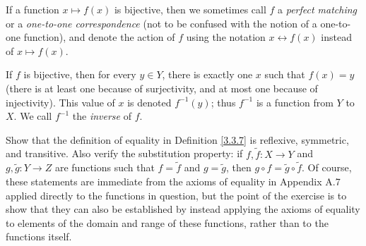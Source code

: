 \setcounter{theorem}{22}
\begin{remark}\label{3.3.23}
If a function \(x \mapsto f(x)\) is bijective, then we sometimes call \(f\) a \emph{perfect matching} or a \emph{one-to-one correspondence} (not to be confused with the notion of a one-to-one function), and denote the action of \(f\) using the notation \(x \leftrightarrow f(x)\) instead of \(x \mapsto f(x)\).
\end{remark}

\begin{note}
If \(f\) is bijective, then for every \(y \in Y\), there is exactly one \(x\) such that \(f(x) = y\) (there is at least one because of surjectivity, and at most one because of injectivity).
This value of \(x\) is denoted \(f^{-1}(y)\); thus \(f^{-1}\) is a function from \(Y\) to \(X\).
We call \(f^{-1}\) the \emph{inverse} of \(f\).
\end{note}

\exercisesection

\begin{exercise}\label{ex 3.3.1}
Show that the definition of equality in Definition \ref{3.3.7} is reflexive, symmetric, and transitive.
Also verify the substitution property: if \(f, \tilde{f} : X \to Y\) and \(g, \tilde{g} : Y \to Z\) are functions such that \(f = \tilde{f}\) and \(g = \tilde{g}\), then \(g \circ f = \tilde{g} \circ \tilde{f}\).
Of course, these statements are immediate from the axioms of equality in Appendix A.7 applied directly to the functions in question, but the point of the exercise is to show that they can also be established by instead applying the axioms of equality to elements of the domain and range of these functions, rather than to the functions itself.
\end{exercise}

